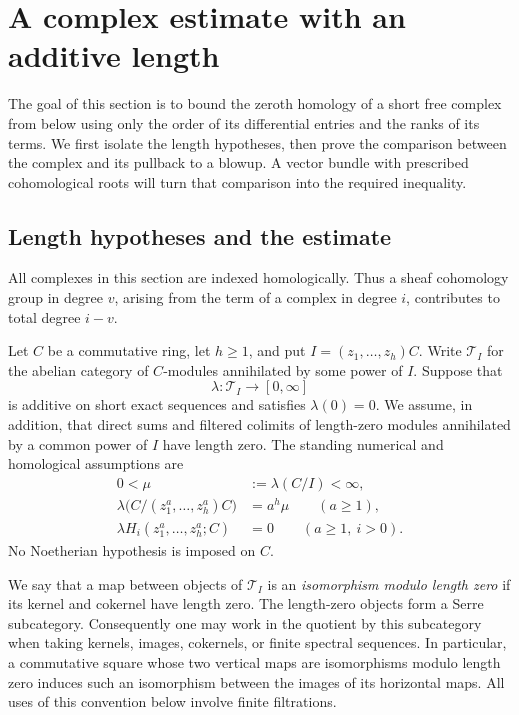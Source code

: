 \section{A complex estimate with an additive length}\label{sec:complex}

The goal of this section is to bound the zeroth homology of a short
free complex from below using only the order of its differential
entries and the ranks of its terms. We first isolate the length
hypotheses, then prove the comparison between the complex and its
pullback to a blowup. A vector bundle with prescribed cohomological
roots will turn that comparison into the required inequality.

\subsection{Length hypotheses and the estimate}

All complexes in this section are indexed homologically. Thus a sheaf
cohomology group in degree $v$, arising from the term of a complex in degree
$i$, contributes to total degree $i-v$.

Let $C$ be a commutative ring, let $h\geq 1$, and put
$I=(z_1,\ldots,z_h)C$. Write $\mathscr T_I$ for the abelian category of
$C$-modules annihilated by some power of $I$. Suppose that
\[
 \lambda:\mathscr T_I\longrightarrow [0,\infty]
\]
is additive on short exact sequences and satisfies $\lambda(0)=0$.
We assume, in addition, that direct sums and filtered colimits of
length-zero modules annihilated by a common power of $I$ have length zero.
The standing numerical and homological assumptions are
\begin{equation}\label{eq:complex-length-hypotheses}
 \begin{split}
 0<\mu&:=\lambda(C/I)<\infty,\\
 \lambda\bigl(C/(z_1^a,\ldots,z_h^a)C\bigr)&=a^h\mu
       \qquad(a\geq 1),\\
 \lambda H_i(z_1^a,\ldots,z_h^a;C)&=0
       \qquad(a\geq 1,\ i>0).
 \end{split}
\end{equation}
No Noetherian hypothesis is imposed on $C$.

We say that a map between objects of $\mathscr T_I$ is an
\emph{isomorphism modulo length zero} if its kernel and cokernel have
length zero. The length-zero objects form a Serre subcategory. Consequently
one may work in the quotient by this subcategory when taking kernels,
images, cokernels, or finite spectral sequences. In particular, a
commutative square whose two vertical maps are isomorphisms modulo length
zero induces such an isomorphism between the images of its horizontal
maps. All uses of this convention below involve finite filtrations.

